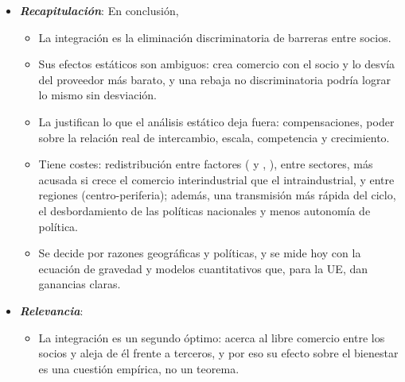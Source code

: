 \documentclass[11pt]{article}
\begin{document}
\begin{itemize}
\item \textbf{\emph{Recapitulación}}: En conclusión,
  \begin{itemize}
  \item La integración es la eliminación discriminatoria de barreras entre socios.
  \item Sus efectos estáticos son ambiguos: crea comercio con el socio y lo desvía del proveedor más barato, y una rebaja no discriminatoria podría lograr lo mismo sin desviación.
  \item La justifican lo que el análisis estático deja fuera: compensaciones, poder sobre la relación real de intercambio, escala, competencia y crecimiento.
  \item Tiene costes: redistribución entre factores ( y , ), entre sectores, más acusada si crece el comercio interindustrial que el intraindustrial, y entre regiones (centro-periferia); además, una transmisión más rápida del ciclo, el desbordamiento de las políticas nacionales y menos autonomía de política.
  \item Se decide por razones geográficas y políticas, y se mide hoy con la ecuación de gravedad y modelos cuantitativos que, para la UE, dan ganancias claras.
  \end{itemize}
\item \textbf{\emph{Relevancia}}:
  \begin{itemize}
  \item La integración es un segundo óptimo: acerca al libre comercio entre los socios y aleja de él frente a terceros, y por eso su efecto sobre el bienestar es una cuestión empírica, no un teorema.


\end{itemize}
\end{itemize}
\end{document}
